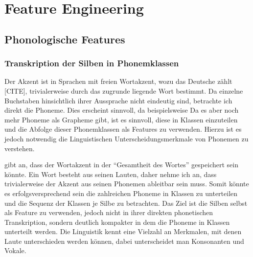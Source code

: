  
\chapter{Feature Engineering}   
\section{Phonologische Features}




\subsection{Transkription der Silben in Phonemklassen}

Der Akzent ist in Sprachen mit freien Wortakzent, wozu das Deutsche zählt [CITE], trivialerweise durch das zugrunde liegende Wort bestimmt. Da einzelne Buchstaben hinsichtlich ihrer Aussprache nicht eindeutig sind, betrachte ich direkt die Phoneme.
Dies erscheint sinnvoll, da beispielsweise 
Da es aber noch mehr Phoneme als Grapheme gibt, ist es sinnvoll, diese in Klassen einzuteilen und die Abfolge dieser Phonemklassen als Features zu verwenden.
Hierzu ist es jedoch notwendig die Linguistischen Unterscheidungsmerkmale von Phonemen zu verstehen.

\cite[S.~12]{Mengel1998} gibt an, dass der Wortakzent in der \enquote{Gesamtheit des Wortes} gespeichert sein könnte. Ein Wort besteht aus seinen Lauten, daher nehme ich an, dass trivialerweise der Akzent aus seinen Phonemen ableitbar sein muss. Somit könnte es erfolgsversprechend sein die zahlreichen Phoneme in Klassen zu unterteilen und die Sequenz der Klassen je Silbe zu betrachten. Das Ziel ist die Silben selbst als Feature zu verwenden, jedoch nicht in ihrer direkten phonetischen Transkription, sondern deutlich kompakter in dem die Phoneme in Klassen unterteilt werden.
Die Linguistik kennt eine Vielzahl an Merkmalen, mit denen Laute unterschieden werden können, dabei unterscheidet man Konsonanten und Vokale.

